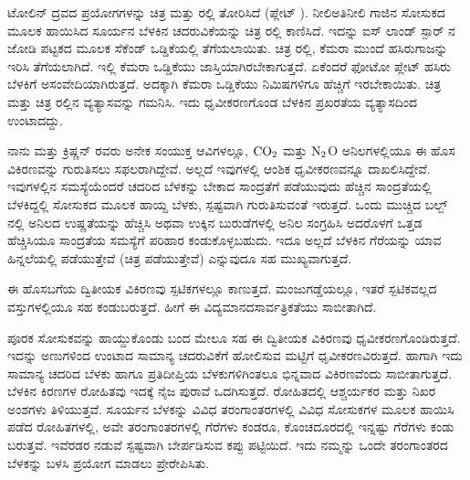 ಟೋಲಿನ್ ದ್ರವದ ಪ್ರಯೋಗಗಳನ್ನು ಚಿತ್ರ  ಮತ್ತು ರಲ್ಲಿ ತೋರಿಸಿದೆ (ಪ್ಲೇಟ್ ). ನೀಲಿ\enginline{-}ಅತಿನೀಲಿ ಗಾಜಿನ ಸೋಸುಕದ ಮೂಲಕ ಹಾಯಿಸಿದ ಸೂರ್ಯನ ಬೆಳಕಿನ ಚದರುವಿಕೆಯನ್ನು ಚಿತ್ರ ರಲ್ಲಿ ಕಾಣಿಸಿದೆ. ಇದನ್ನು ಐಸ್ ಲಾಂಡ್ ಸ್ಪಾರ್ ನ ಜೋಡಿ ಪಟ್ಟಕದ ಮೂಲಕ  ಸೆಕೆಂಡ್ ಒಡ್ಡಿಕೆಯಲ್ಲಿ ತೆಗೆಯಲಾಯಿತು. ಚಿತ್ರ ರಲ್ಲಿ, ಕೆಮರಾ ಮುಂದೆ ಹಸಿರುಗಾಜನ್ನು ಇರಿಸಿ ತೆಗೆಯಲಾಗಿದೆ. ಇಲ್ಲಿ ಕೆಮರಾ ಒಡ್ಡಿಕೆಯು ಜಾಸ್ತಿಯಾಗಿರಬೇಕಾಗುತ್ತದೆ. ಏಕೆಂದರೆ ಫೋಟೋ ಪ್ಲೇಟ್ ಹಸಿರು ಬೆಳಕಿಗೆ ಅಸಂವೇದಿಯಾಗಿರುತ್ತದೆ. ಅದಕ್ಕಾಗಿ ಕೆಮರಾ ಒಡ್ಡಿಕೆಯು  ನಿಮಿಷಗಳಿಗೂ ಹೆಚ್ಚಿಗೆ ಇರಬೇಕಾಯಿತು. ಚಿತ್ರ  ಮತ್ತು ಚಿತ್ರ ರಲ್ಲಿನ ವ್ಯತ್ಯಾಸವನ್ನು ಗಮನಿಸಿ. ಇದು ಧೃವೀಕರಣಗೊಂಡ ಬೆಳಕಿನ ಪ್ರಖರತೆಯ ವ್ಯತ್ಯಾಸದಿಂದ ಉಂಟಾದದ್ದು.

ನಾನು ಮತ್ತು ಕ್ರಿಷ್ಣನ್ ರವರು ಅನೇಕ ಸಂಯುಕ್ತ ಆವಿಗಳಲ್ಲೂ, ${\rm CO}_2$ ಮತ್ತು ${\rm N}_2${\rm O} ಅನಿಲಗಳಲ್ಲಿಯೂ ಈ ಹೊಸ ವಿಕಿರಣವನ್ನು ಗುರುತಿಸಲು ಸಫಲರಾಗಿದ್ದೇವೆ. ಅಲ್ಲದೆ ಇವುಗಳಲ್ಲಿ ಆಂಶಿಕ ಧೃವೀಕರಣವನ್ನೂ ದಾಖಲಿಸಿದ್ದೇವೆ. ಇವುಗಳಲ್ಲಿನ ಸಮಸ್ಯೆಯೆಂದರೆ ಚದರಿದ ಬೆಳಕನ್ನು ಬೇಕಾದ ಸಾಂದ್ರತೆಗೆ ಪಡೆಯುವುದು ಹೆಚ್ಚಿನ ಸಾಂದ್ರತೆಯಲ್ಲಿ ಬೆಳಕಿದ್ದಲ್ಲಿ ಸೋಸುಕದ ಮೂಲಕ ಹಾಯ್ದ ಬೆಳಕು, ಸ್ಪಷ್ಟವಾಗಿ ಗುರುತಿಸುವಂತೆ ಇರುತ್ತದೆ. ಒಂದು ಮುಚ್ಚಿದ ಬಲ್ಬ್ ನಲ್ಲಿ ಅನಿಲದ ಉಷ್ಣತೆಯನ್ನು ಹೆಚ್ಚಿಸಿ ಅಥವಾ ಉಕ್ಕಿನ ಬುರುಡೆಗಳಲ್ಲಿ ಅನಿಲ ಸಂಗ್ರಹಿಸಿ ಅದರೊಳಗೆ ಒತ್ತಡ ಹೆಚ್ಚಿಸಿಯೂ ಸಾಂದ್ರತೆಯ ಸಮಸ್ಯೆಗೆ ಪರಿಹಾರ ಕಂಡುಕೊಳ್ಳಬಹುದು. ಇದೂ ಅಲ್ಲದೆ ಬೆಳಕಿನ ಗೆರೆಯನ್ನು ಯಾವ ಹಿನ್ನಲೆಯಲ್ಲಿ ಪಡೆಯುತ್ತೇವೆ (ಚಿತ್ರ ಪಡೆಯುತ್ತೇವೆ) ಎನ್ನುವುದೂ ಸಹ ಮುಖ್ಯವಾಗುತ್ತದೆ.

\newpage

ಈ ಹೊಸಬಗೆಯ ದ್ವಿತೀಯಕ ವಿಕಿರಣವು ಸ್ಪಟಿಕಗಳಲ್ಲೂ ಕಾಣುತ್ತದೆ. ಮಂಜುಗಡ್ಡೆಯಲ್ಲೂ, ಇತರೆ ಸ್ಪಟಿಕವಲ್ಲದ ವಸ್ತುಗಳಲ್ಲಿಯೂ ಸಹ ಕಂಡುಬರುತ್ತದೆ. ಹೀಗೆ ಈ ವಿದ್ಯಮಾನದ\break ಸಾರ್ವತ್ರಿಕತೆಯು ಸಾಬೀತಾಗಿದೆ.



ಪೂರಕ ಸೋಸುಕವನ್ನು ಹಾಯ್ದುಕೊಂಡು ಬಂದ ಮೇಲೂ ಸಹ ಈ ದ್ವಿತೀಯಕ ವಿಕಿರಣವು ಧೃವೀಕರಣಗೊಂಡಿರುತ್ತದೆ. ಇದನ್ನು ಅಣುಗಳಿಂದ ಉಂಟಾದ ಸಾಮಾನ್ಯ ಚದರುವಿಕೆಗೆ ಹೋಲಿಸುವ ಮಟ್ಟಿಗೆ ಧೃವೀಕರಣವಿರುತ್ತದೆ. ಹಾಗಾಗಿ ಇದು ಸಾಮಾನ್ಯ ಚದರಿದ ಬೆಳಕು ಹಾಗೂ ಪ್ರತಿದೀಪ್ತಿಯ ಬೆಳಕುಗಳಿಗಿಂತಲೂ ಭಿನ್ನವಾದ ವಿಕಿರಣವೆಂದು ಸಾಬೀತಾಗುತ್ತದೆ. ಬೆಳಕಿನ ಕಿರಣಗಳ ರೋಹಿತವು ಇದಕ್ಕೆ ನೈಜ ಪುರಾವೆ ಒದಗಿಸುತ್ತದೆ. ರೋಹಿತದಲ್ಲಿ ಆಶ್ಚರ್ಯಕರ ಮತ್ತು ನಿಖರ ಅಂಶಗಳು ತಿಳಿಯುತ್ತವೆ. ಸೂರ್ಯನ ಬೆಳಕನ್ನು ವಿವಿಧ ತರಂಗಾಂತರಗಳಲ್ಲಿ ವಿವಿಧ ಸೋಸುಕಗಳ ಮೂಲಕ ಹಾಯಿಸಿ ಪಡೆದ ರೋಹಿತಗಳಲ್ಲಿ, ಅವೇ ತರಂಗಾಂತರಗಳಲ್ಲಿ ಗೆರೆಗಳು ಕಂಡರೂ, ಕೊಂಚದೂರದಲ್ಲಿ ಇನ್ನಷ್ಟು ಗೆರೆಗಳು ಕಂಡು ಬರುತ್ತವೆ. ಇವೆರಡರ ನಡುವೆ ಸ್ಪಷ್ಟವಾಗಿ ಬೇರ್ಪಡಿಸುವ ಕಪ್ಪು ಪಟ್ಟಿಯಿದೆ. ಇದು ನಮ್ಮನ್ನು ಒಂದೇ ತರಂಗಾಂತರದ ಬೆಳಕನ್ನು ಬಳಸಿ ಪ್ರಯೋಗ ಮಾಡಲು ಪ್ರೇರೇಪಿಸಿತು.

